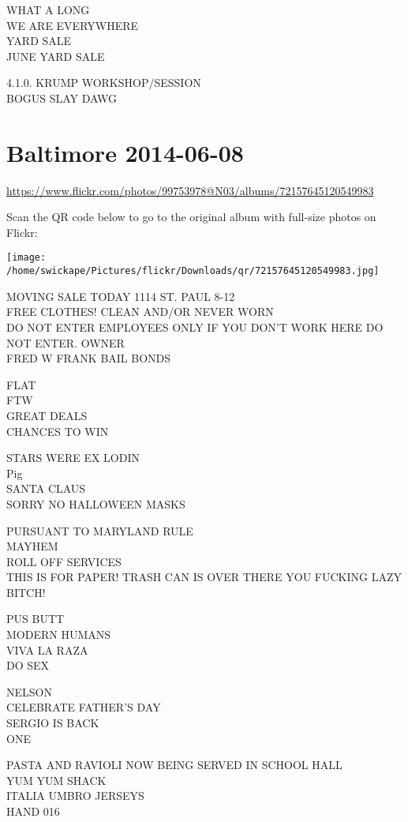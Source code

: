 \documentclass[10pt,letterpaper]{article}
\begin{document}
WHAT A LONG\\
WE ARE EVERYWHERE\\
YARD SALE\\
JUNE YARD SALE

4.1.0. KRUMP WORKSHOP/SESSION\\
BOGUS SLAY DAWG


\section*{Baltimore 2014-06-08}

\url{https://www.flickr.com/photos/99753978@N03/albums/72157645120549983}

Scan the QR code below to go to the original album with full-size photos on Flickr:

\texttt{[image: /home/swickape/Pictures/flickr/Downloads/qr/72157645120549983.jpg]}


MOVING SALE TODAY 1114 ST. PAUL 8{-}12\\
FREE CLOTHES! CLEAN AND/OR NEVER WORN\\
DO NOT ENTER EMPLOYEES ONLY IF YOU DON'T WORK HERE DO NOT ENTER.  OWNER\\
FRED W FRANK BAIL BONDS

FLAT\\
FTW\\
GREAT DEALS\\
CHANCES TO WIN

STARS WERE EX LODIN\\
Pig\\
SANTA CLAUS\\
SORRY NO HALLOWEEN MASKS

PURSUANT TO MARYLAND RULE\\
MAYHEM\\
ROLL OFF SERVICES\\
THIS IS FOR PAPER!  TRASH CAN IS OVER THERE YOU FUCKING LAZY BITCH!

PUS BUTT\\
MODERN HUMANS\\
VIVA LA RAZA\\
DO SEX

NELSON\\
CELEBRATE FATHER'S DAY\\
SERGIO IS BACK\\
ONE

PASTA AND RAVIOLI NOW BEING SERVED IN SCHOOL HALL\\
YUM YUM SHACK\\
ITALIA UMBRO JERSEYS\\
HAND 016
\end{document}
